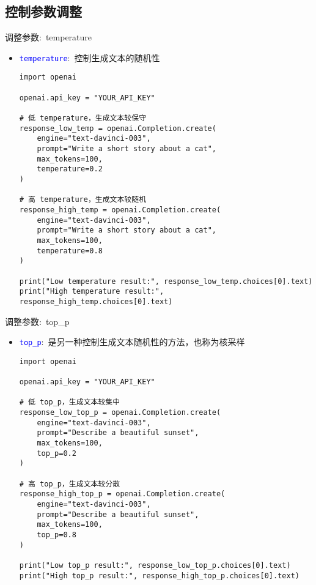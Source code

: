 \subsection{控制参数调整}
\begin{frame}{调整参数:~\textrm{temperature}}
    \begin{itemize}
	    \item \texttt{\textcolor{blue}{temperature}}:~控制生成文本的随机性\\
	{\fontsize{7.5pt}{6.2pt}}
        \begin{lstlisting}[style=pythonstyle]
import openai

openai.api_key = "YOUR_API_KEY"

# 低 temperature，生成文本较保守
response_low_temp = openai.Completion.create(
    engine="text-davinci-003",
    prompt="Write a short story about a cat",
    max_tokens=100,
    temperature=0.2
)

# 高 temperature，生成文本较随机
response_high_temp = openai.Completion.create(
    engine="text-davinci-003",
    prompt="Write a short story about a cat",
    max_tokens=100,
    temperature=0.8
)

print("Low temperature result:", response_low_temp.choices[0].text)
print("High temperature result:", response_high_temp.choices[0].text)
        \end{lstlisting}
    \end{itemize}
    \end{frame}

\begin{frame}{调整参数:~\textrm{top\_p}}
    \begin{itemize}
	    \item \texttt{\textcolor{blue}{top\_p}}:~是另一种控制生成文本随机性的方法，也称为核采样\\
		    {\fontsize{7.5pt}{6.2pt}}
        \begin{lstlisting}[style=pythonstyle]
import openai

openai.api_key = "YOUR_API_KEY"

# 低 top_p，生成文本较集中
response_low_top_p = openai.Completion.create(
    engine="text-davinci-003",
    prompt="Describe a beautiful sunset",
    max_tokens=100,
    top_p=0.2
)

# 高 top_p，生成文本较分散
response_high_top_p = openai.Completion.create(
    engine="text-davinci-003",
    prompt="Describe a beautiful sunset",
    max_tokens=100,
    top_p=0.8
)

print("Low top_p result:", response_low_top_p.choices[0].text)
print("High top_p result:", response_high_top_p.choices[0].text)
        \end{lstlisting}
    \end{itemize}
\end{frame}

